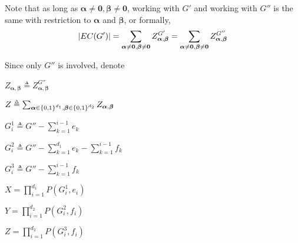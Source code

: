 	Note that as long as $\boldsymbol\alpha \neq \mathbf{0} , \boldsymbol\beta \neq \mathbf{0}$, working with $G'$ and working with $G''$ is the same with restriction to $\boldsymbol\alpha$ and $\boldsymbol\beta$, or formally,
\[\left\vert EC(G')\right\vert = \sum_{\boldsymbol\alpha \neq \mathbf{0}, \boldsymbol\beta \neq \mathbf{0}} Z_{\boldsymbol\alpha, \boldsymbol\beta}^{G'} = \sum_{\boldsymbol\alpha \neq \mathbf{0}, \boldsymbol\beta \neq \mathbf{0}} Z_{\boldsymbol\alpha, \boldsymbol\beta}^{G''}\]

Since only $G''$ is involved, denote

$Z_{\boldsymbol\alpha, \boldsymbol\beta} \triangleq Z_{\boldsymbol\alpha, \boldsymbol\beta}^{G''}$

$Z \triangleq \sum_{\boldsymbol\alpha \in \left\{0,1\right\}^{d_1} , \boldsymbol\beta \in \left\{0,1\right\}^{d_2}} Z_{\boldsymbol\alpha, \boldsymbol\beta}$


    $G_i^1 \triangleq G'' - \sum_{k=1}^{i-1} e_k$

    $G_i^2 \triangleq G'' - \sum_{k=1}^{d_1}e_k - \sum_{k=1}^{i-1} f_k$

    $G_i^3 \triangleq G'' - \sum_{k=1}^{i-1} f_k$

    $X = \prod_{i=1}^{d_1} P(G_i^1, e_i)$

    $Y = \prod_{i=1}^{d_2} P(G_i^2, f_i)$

    $Z = \prod_{i=1}^{d_2} P(G_i^3, f_i)$



